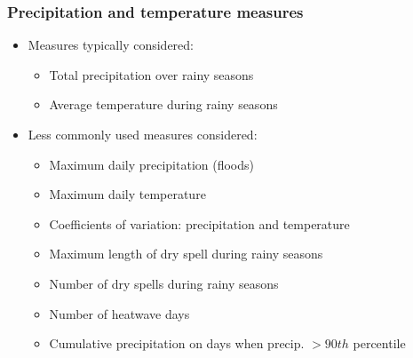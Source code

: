 \documentclass{beamer}              %
\begin{document}



\begin{frame}\label{measures} 
\small
\frametitle{Precipitation and temperature measures}
\begin{itemize}
\item Measures typically considered:

	\begin{itemize}
		\item Total precipitation over rainy seasons
		\item Average temperature during rainy seasons
	\end{itemize}
	
\item{Less commonly used measures considered:}
	\begin{itemize}
		\item Maximum daily precipitation (floods)
		\item Maximum daily temperature
		\item Coefficients of variation: precipitation and temperature
		\item Maximum length of dry spell during rainy seasons
		\item Number of dry spells during rainy seasons
		\item Number of heatwave days
		\item Cumulative precipitation on days when precip. $>90th$ percentile
	\end{itemize}

\end{itemize}
\end{frame}

\end{document}
